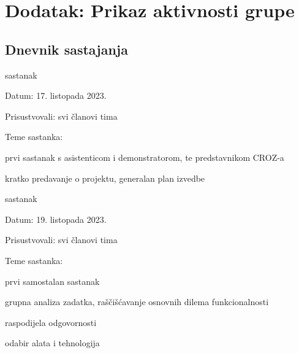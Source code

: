 \chapter*{Dodatak: Prikaz aktivnosti grupe}
		
		\section*{Dnevnik sastajanja}
		
		\begin{packed_enum}
			\item  sastanak
			
			\item[] \begin{packed_item}
				\item Datum: 17. listopada 2023.
				\item Prisustvovali: svi članovi tima
				\item Teme sastanka:
				\begin{packed_item}
					\item  prvi sastanak s asistenticom i demonstratorom, te predstavnikom CROZ-a
					\item  kratko predavanje o projektu, generalan plan izvedbe
				\end{packed_item}
			\end{packed_item}
			
			\item  sastanak
			\item[] \begin{packed_item}
				\item Datum: 19. listopada 2023.
				\item Prisustvovali: svi članovi tima
				\item Teme sastanka:
				\begin{packed_item}
					\item  prvi samostalan sastanak
					\item  grupna analiza zadatka, raščišćavanje osnovnih dilema funkcionalnosti
					\item  raspodijela odgovornosti
					\item  odabir alata i tehnologija
				\end{packed_item}
			\end{packed_item}
			

\end{packed_enum}
